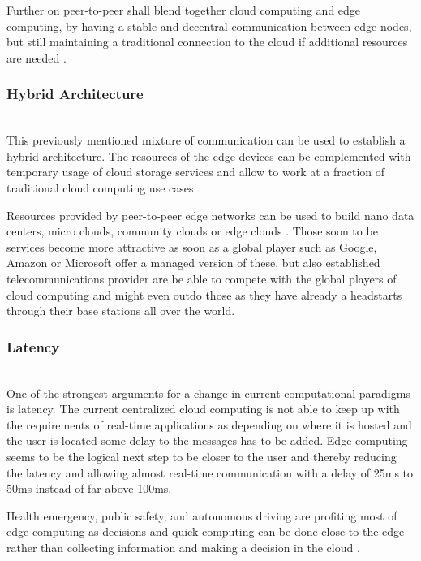 Further on peer-to-peer shall blend together cloud computing and edge computing, by having a stable and decentral communication between edge nodes, but still maintaining a traditional connection to the cloud if additional resources are needed \cite{GarciaLopez:2015:ECV:2831347.2831354}.

\subsubsection{Hybrid Architecture}\hspace*{\fill} \\
This previously mentioned mixture of communication can be used to establish a hybrid architecture. The resources of the edge devices can be complemented with temporary usage of cloud storage services \cite{GarciaLopez:2015:ECV:2831347.2831354} and allow to work at a fraction of traditional cloud computing use cases.

Resources provided by peer-to-peer edge networks can be used to build nano data centers, micro clouds, community clouds or edge clouds \cite{GarciaLopez:2015:ECV:2831347.2831354}. Those soon to be services become more attractive as soon as a global player such as Google, Amazon or Microsoft offer a managed version of these, but also established telecommunications provider are be able to compete with the global players of cloud computing and might even outdo those as they have already a headstarts through their base stations all over the world.

\subsubsection{Latency}\hspace*{\fill} \\
One of the strongest arguments for a change in current computational paradigms is latency. The current centralized cloud computing is not able to keep up with the requirements of real-time applications as depending on where it is hosted and the user is located some delay to the messages has to be added.
Edge computing seems to be the logical next step to be closer to the user and thereby reducing the latency and allowing almost real-time communication with a delay of 25ms to 50ms instead of far above 100ms.

Health emergency, public safety, and autonomous driving are profiting most of edge computing as decisions and quick computing can be done close to the edge rather than collecting information and making a decision in the cloud \cite{7488250}.

